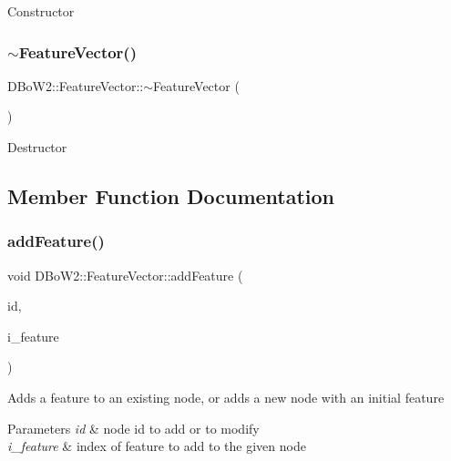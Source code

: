 Constructor \mbox{\label{classDBoW2_1_1FeatureVector_a44514a020719b7e5ac552332a9922bd9}} 
\subsubsection{\texorpdfstring{$\sim$\+Feature\+Vector()}{~FeatureVector()}}
{\footnotesize\ttfamily D\+Bo\+W2\+::\+Feature\+Vector\+::$\sim$\+Feature\+Vector (\begin{DoxyParamCaption}\item[{void}]{ }\end{DoxyParamCaption})}

Destructor 

\subsection{Member Function Documentation}
\mbox{\label{classDBoW2_1_1FeatureVector_ae9554bfcbebc85439616de08f47f2238}} 
\subsubsection{\texorpdfstring{add\+Feature()}{addFeature()}}
{\footnotesize\ttfamily void D\+Bo\+W2\+::\+Feature\+Vector\+::add\+Feature (\begin{DoxyParamCaption}\item[{\hyperlink{namespaceDBoW2_a3a0fa9c50c0df508759362d6204566f2}{Node\+Id}}]{id,  }\item[{unsigned int}]{i\+\_\+feature }\end{DoxyParamCaption})}

Adds a feature to an existing node, or adds a new node with an initial feature 
\begin{DoxyParams}{Parameters}
{\em id} & node id to add or to modify \\
\hline
{\em i\+\_\+feature} & index of feature to add to the given node \\
\hline
\end{DoxyParams}


